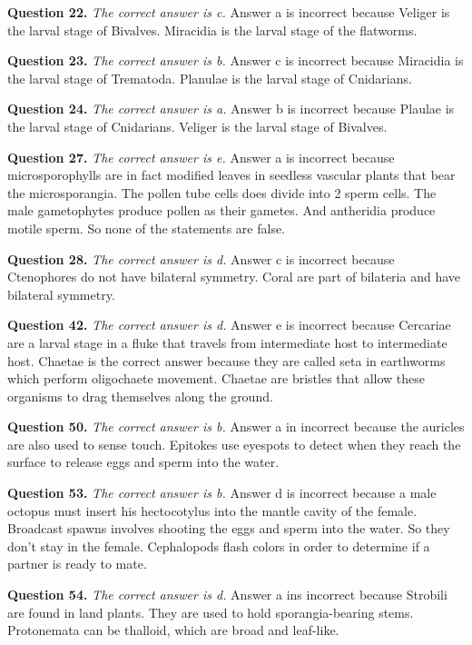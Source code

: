 \documentclass{article}
\begin{document}
\textbf{Question 22.} \textit{The correct answer is c.} Answer a is incorrect
because Veliger is the larval stage of Bivalves. Miracidia is the larval stage
of the flatworms.

\textbf{Question 23.} \textit{The correct answer is b.} Answer c is incorrect
because Miracidia is the larval stage of Trematoda. Planulae is the larval stage
of Cnidarians.

\textbf{Question 24.} \textit{The correct answer is a.} Answer b is incorrect
because Plaulae is the larval stage of Cnidarians. Veliger is the larval stage
of Bivalves.

\textbf{Question 27.} \textit{The correct answer is e.} Answer a is incorrect
because microsporophylls are in fact modified leaves in seedless vascular plants
that bear the microsporangia. The pollen tube cells does divide into 2 sperm
cells. The male gametophytes produce pollen as their gametes. And antheridia
produce motile sperm. So none of the statements are false.

\textbf{Question 28.} \textit{The correct answer is d.} Answer c is incorrect
because Ctenophores do not have bilateral symmetry. Coral are part of bilateria
and have bilateral symmetry.

\textbf{Question 42.} \textit{The correct answer is d.} Answer e is incorrect
because Cercariae are a larval stage in a fluke that travels from intermediate
host to intermediate host. Chaetae is the correct answer because they are called
seta in earthworms which perform oligochaete movement. Chaetae are bristles that
allow these organisms to drag themselves along the ground.

\textbf{Question 50.} \textit{The correct answer is b.} Answer a in incorrect
because the auricles are also used to sense touch. Epitokes use eyespots to
detect when they reach the surface to release eggs and sperm into the water.

\textbf{Question 53.} \textit{The correct answer is b.} Answer d is incorrect
because a male octopus must insert his hectocotylus into the mantle cavity of
the female. Broadcast spawns involves shooting the eggs and sperm into the
water. So they don't stay in the female. Cephalopods flash colors in order to
determine if a partner is ready to mate.

\textbf{Question 54.} \textit{The correct answer is d.} Answer a ins incorrect
because Strobili are found in land plants. They are used to hold
sporangia-bearing stems. Protonemata can be thalloid, which are broad and
leaf-like.
\end{document}
